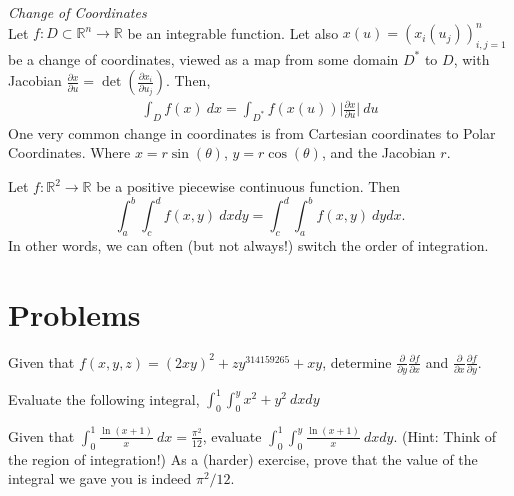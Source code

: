 \documentclass{article}
\begin{document}
\emph{Change of Coordinates} \\
Let $f: D \subset \mathbb{R}^n \rightarrow \mathbb{R}$ be an integrable function. Let also $x(u) =(x_i(u_j ))^{n}_{i,j=1}$ be a change of coordinates, viewed as a map from some domain $D^*$ to $D$, with Jacobian $\frac{\partial x}{\partial u} = \det \left( \frac{\partial x_i}{\partial u_j}\right)$. Then,
    \begin{align*} 
        \int_D f(x)\ d\!x = \int_{D^*} f(x(u)) \bigg| \frac{\partial x}{\partial u} \bigg|\ d\!u
    \end{align*}
One very common change in coordinates is from Cartesian coordinates to Polar Coordinates. Where $x = r\sin(\theta)$, $y = r\cos(\theta)$, and the Jacobian $r$.

\begin{theorem}[Tonelli]
Let \(f:\mathbb R^2\to\mathbb R\) be a positive piecewise continuous function. Then
\[\int_a^b\!\int_c^df(x,y)\ d\!xd\!y = \int_c^d\!\int_a^bf(x,y)\ d\!yd\!x.\]
In other words, we can often (but not always!) switch the order of integration.
\end{theorem}



\section{Problems} 

\begin{exercise}
    Given that $f(x,y,z) = (2xy)^2 + zy^{314159265} + xy$, determine $\frac{\partial}{\partial y}\frac{\partial f}{\partial x}$ and $\frac{\partial}{\partial x}\frac{\partial f}{\partial y}$.
\end{exercise}
\begin{exercise} 
    Evaluate the following integral, $\int_{0}^{1} \int_{0}^{y} x^2 + y^2\ d\!xd\!y$
\end{exercise}


\begin{exercise}
    Given that $\int_{0}^{1} \frac{\ln(x+1)}{x}\ d\!x = \frac{\pi^2}{12}$,
    evaluate $\int_{0}^{1} \int_{0}^{y} \frac{\ln(x+1)}{x}\ d\!xd\!y$.
    (Hint: Think of the region of integration!)
    As a (harder) exercise, prove that the value of the integral we gave you is indeed $\pi^2/12$.
\end{exercise}
\end{document}
